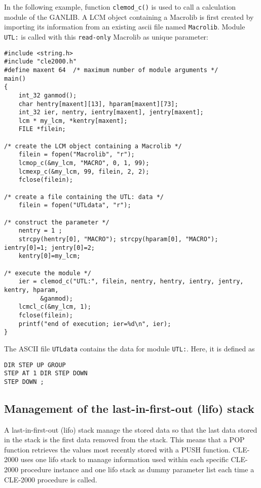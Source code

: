 \vskip 0.8cm

In the following example, function {\tt clemod\_c()} is used to call a calculation module of the GANLIB. A LCM object
containing a Macrolib is first created by importing its information from an existing {\sc ascii} file named {\tt Macrolib}.
Module {\tt UTL:} is called with this {\tt read-only} Macrolib as unique parameter:
\begin{verbatim}
#include <string.h>
#include "cle2000.h"
#define maxent 64  /* maximum number of module arguments */
main()
{
    int_32 ganmod();
    char hentry[maxent][13], hparam[maxent][73];
    int_32 ier, nentry, ientry[maxent], jentry[maxent];
    lcm * my_lcm, *kentry[maxent];
    FILE *filein;
    
/* create the LCM object containing a Macrolib */
    filein = fopen("Macrolib", "r");
    lcmop_c(&my_lcm, "MACRO", 0, 1, 99);
    lcmexp_c(&my_lcm, 99, filein, 2, 2);
    fclose(filein);
 
/* create a file containing the UTL: data */
    filein = fopen("UTLdata", "r");

/* construct the parameter */
    nentry = 1 ;
    strcpy(hentry[0], "MACRO"); strcpy(hparam[0], "MACRO"); ientry[0]=1; jentry[0]=2;
    kentry[0]=my_lcm;
 
/* execute the module */
    ier = clemod_c("UTL:", filein, nentry, hentry, ientry, jentry, kentry, hparam,
          &ganmod);    
    lcmcl_c(&my_lcm, 1);
    fclose(filein);
    printf("end of execution; ier=%d\n", ier);
}
\end{verbatim}

\vskip 0.08cm

The ASCII file {\tt UTLdata} contains the data for module {\tt UTL:}. Here, it is defined as
\begin{verbatim}
DIR STEP UP GROUP
STEP AT 1 DIR STEP DOWN
STEP DOWN ;
\end{verbatim}

\vskip 0.8cm

\subsection{Management of the last-in-first-out (lifo) stack}\label{sect:lifo}

A last-in-first-out (lifo) stack manage the stored data so that the last data stored in the stack is the first data removed from the stack. This means that a POP function retrieves the values most recently stored with a PUSH function. CLE-2000 uses one lifo stack to manage information used within each specific CLE-2000 procedure instance and one lifo stack as dummy parameter list each time a CLE-2000 procedure is called.

